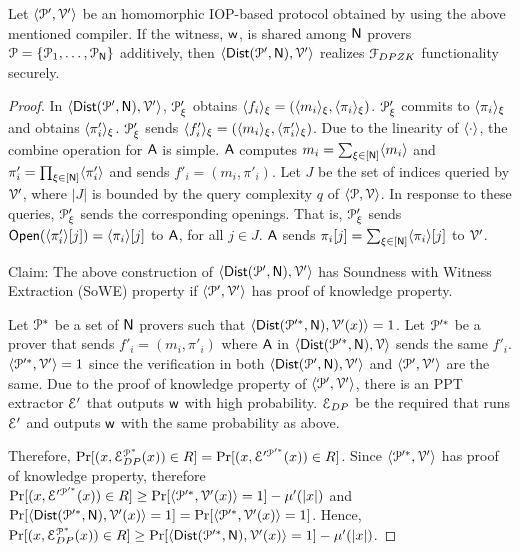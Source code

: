 \begin{lemma}\label{lemma:generic_dpzk}
	Let $\langle \mathcal{P}',\mathcal{V}'\rangle$ be an homomorphic IOP-based protocol obtained by using the above mentioned compiler. If the witness, $\mathsf{w}$, is shared among $\mathsf{N}$ provers $\mathcal{P} = \{\mathcal{P}_1, \ldots, \mathcal{P}_{\mathsf{N}}\}$ additively, then $\langle \mathsf{Dist}(\mathcal{P}', \mathsf{N}),\mathcal{V}'\rangle$  realizes $\mathcal{F}_{DPZK}$ functionality securely.
\end{lemma}
	
\begin{proof}
	In $\langle \mathsf{Dist}(\mathcal{P}', \mathsf{N}),\mathcal{V}'\rangle$, $\mathcal{P}_\xi'$ obtains $\langle f_i \rangle_{\xi} = (\langle m_i \rangle_{\xi}, \langle \pi_i \rangle_{\xi})$. $\mathcal{P}_\xi'$ commits to $\langle \pi_i \rangle_{\xi}$ and obtains $\langle \pi'_i \rangle_{\xi}$. $\mathcal{P}_\xi'$ sends $\langle f'_i \rangle_{\xi} = (\langle m_i \rangle_{\xi}, \langle \pi'_i \rangle_{\xi})$. Due to the linearity of $\langle \cdot \rangle$, the combine operation for $\mathsf{A}$ is simple. $\mathsf{A}$ computes $m_i = \sum_{\xi\in [\mathsf{N}]} \langle m_i \rangle$ and $\pi'_i = \prod_{\xi \in [\mathsf{N}]} \langle \pi'_i \rangle$ and sends $f'_i = (m_i,\pi'_i)$.
	Let $J$ be the set of indices queried by $\mathcal{V}'$, where $|J|$ is bounded by the query complexity $q$ of $\langle \mathcal{P},\mathcal{V}\rangle$. In response to these queries, $\mathcal{P}_\xi'$ sends the corresponding openings. That is, $\mathcal{P}_\xi'$ sends $\mathsf{Open}(\langle \pi'_i \rangle[j]) = \langle \pi_i \rangle[j]$ to $\mathsf{A}$, for all $j \in J$. $\mathsf{A}$ sends $\pi_i[j] = \sum_{\xi\in [\mathsf{N}]} \langle \pi_i \rangle[j]$ to $\mathcal{V}'$.
	
	Claim: The above construction of $\langle \mathsf{Dist}(\mathcal{P}', \mathsf{N}),\mathcal{V}'\rangle$ has Soundness with Witness Extraction (SoWE) property if $\langle \mathcal{P}',\mathcal{V}'\rangle$ has proof of knowledge property. 
	
	Let $\mathcal{P}^\ast$ be a set of $\mathsf{N}$ provers such that $\langle \mathsf{Dist}(\mathcal{P}'^\ast, \mathsf{N}),\mathcal{V}'({x})\rangle = 1$. Let $\mathcal{P}'^\ast$ be a prover that sends $f'_i = (m_i, \pi'_i)$ where $\mathsf{A}$ in $\langle \mathsf{Dist}(\mathcal{P}'^\ast, \mathsf{N}),\mathcal{V}\rangle$ sends the same $f'_i$. 
	$\langle \mathcal{P}'^\ast,\mathcal{V}'\rangle = 1$ since the verification in both $\langle \mathsf{Dist}(\mathcal{P}', \mathsf{N}),\mathcal{V}'\rangle$ and $\langle \mathcal{P}',\mathcal{V}'\rangle$ are the same. Due to the proof of knowledge property of $\langle \mathcal{P}',\mathcal{V}'\rangle$, there is an PPT extractor $\mathcal{E}'$ that outputs $\mathsf{w}$ with high probability. $\mathcal{E}_{DP}$ be the required that runs $\mathcal{E}'$ and outputs $\mathsf{w}$ with the same probability as above.
	
	Therefore, $\Pr[({x}, \mathcal{E}_{DP}^{\mathcal{P}^\ast}({x})) \in R] = \Pr[({x}, \mathcal{E}'^{\mathcal{P}'^\ast}({x})) \in R]$.
	Since $\langle \mathcal{P}'^\ast,\mathcal{V}'\rangle$ has proof of knowledge property, therefore $\Pr[({x}, \mathcal{E}'^{\mathcal{P}'^\ast}({x})) \in R] \geq \Pr[\langle \mathcal{P}'^\ast,\mathcal{V}'({x})\rangle = 1] - \mu'(|{x}|)$ and 
	$\Pr[\langle \mathsf{Dist}(\mathcal{P}'^\ast, \mathsf{N}),\mathcal{V}'({x})\rangle = 1] = \Pr[\langle \mathcal{P}'^\ast,\mathcal{V}'({x})\rangle = 1]$.
	Hence, $\Pr[({x}, \mathcal{E}_{DP}^{\mathcal{P}^\ast}({x})) \in R] \geq \Pr[\langle \mathsf{Dist}(\mathcal{P}'^\ast, \mathsf{N}),\mathcal{V}'({x})\rangle = 1] - \mu'(|{x}|)$.
	

\end{proof}
